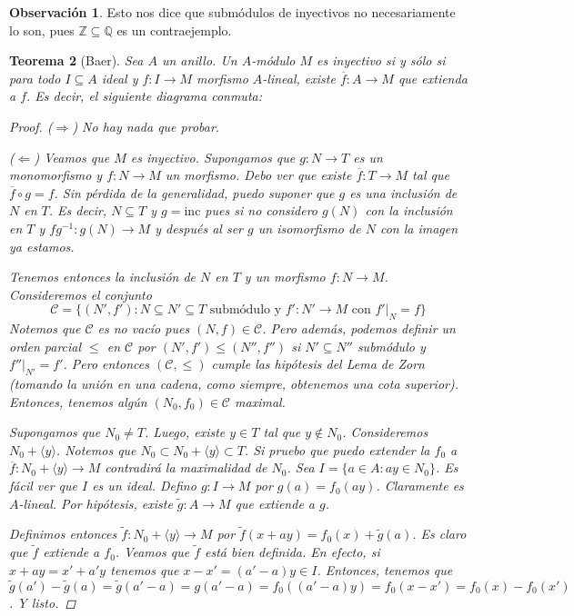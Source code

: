 \documentclass[12pt]{book}
\newtheorem{teo}{Teorema}[section]
\theoremstyle{definition}
\newtheorem{obs}[teo]{Observación}
\newcommand{\ZZ}{\mathbb{Z}}      %
\newcommand{\QQ}{\mathbb{Q}}
\begin{document}
\begin{obs}
Esto nos dice que submódulos de inyectivos no necesariamente lo son, pues $\ZZ\subseteq \QQ$ es un contraejemplo.
\end{obs}

\begin{teo}[Baer]
Sea $A$ un anillo. Un $A$-módulo $M$ es inyectivo si y sólo si para todo $I\subseteq A$ ideal y $f:I\to M$ morfismo $A$-lineal, existe $\overline{f}:A\to M$ que extienda a $f$. Es decir, el siguiente diagrama conmuta: 
\begin{proof}
($\Longrightarrow$) No hay nada que probar.

($\Longleftarrow$) Veamos que $M$ es inyectivo. Supongamos que $g:N\to T$ es un monomorfismo y $f:N\to M$ un morfismo. Debo ver que existe $\overline{f}:T\to M$ tal que $\overline{f}\circ g=f$. Sin pérdida de la generalidad, puedo suponer que $g$ es una inclusión de $N$ en $T$. Es decir, $N\subseteq T$ y $g=\mathrm{inc}$ pues si no considero $g(N)$ con la inclusión en $T$ y $fg^{-1}:g(N)\to M$ y después al ser $g$ un isomorfismo de $N$ con la imagen ya estamos.

Tenemos entonces la inclusión de $N$ en $T$ y un morfismo $f:N\to M$. Consideremos el conjunto $$\mathcal{C}=\{(N',f') : N\subseteq N'\subseteq T \text{ submódulo y } f':N'\to M \text{ con }\left. f'\right|_{N}=f\}$$ Notemos que $\mathcal{C}$ es no vacío pues $(N,f)\in\mathcal{C}$. Pero además, podemos definir un orden parcial $\leq$ en $\mathcal{C}$ por $(N',f')\leq(N'',f'')$ si $N'\subseteq N''$ submódulo y $\left. f''\right|_{N'}=f'$. Pero entonces $(\mathcal{C},\leq)$ cumple las hipótesis del Lema de Zorn (tomando la unión en una cadena, como siempre, obtenemos una cota superior). Entonces, tenemos algún $(N_0,f_0)\in\mathcal{C}$ maximal.

Supongamos que $N_0\neq T$. Luego, existe $y\in T$ tal que $y\notin N_0$. Consideremos $N_0+\langle y\rangle$. Notemos que $N_0\subset N_0+\langle y\rangle \subset T$. Si pruebo que puedo extender la $f_0$ a $\overline{f}:N_0+\langle y\rangle \to M$ contradirá la maximalidad de $N_0$. Sea $I=\{a\in A : ay\in N_0\}$. Es fácil ver que $I$ es un ideal. Defino $g:I\to M$ por $g(a)=f_0(ay)$. Claramente es $A$-lineal. Por hipótesis, existe $\tilde{g}:A\to M$ que extiende a $g$.

Definimos entonces $\tilde{f}:N_0 + \langle y\rangle\to M$ por $\tilde{f}(x+ay) = f_0(x)+\tilde{g}(a)$. Es claro que $\tilde{f}$ extiende a $f_0$. Veamos que $\tilde{f}$ está bien definida. En efecto, si $x+ay=x'+a'y$ tenemos que $x-x' = (a'-a)y\in I$. Entonces, tenemos que $\tilde{g}(a')-\tilde{g}(a) = \tilde{g}(a'-a) = g(a'-a) = f_0((a'-a)y) = f_0(x-x') = f_0(x)-f_0(x')$. Y listo.

\end{proof}
\end{teo}
\end{document}
